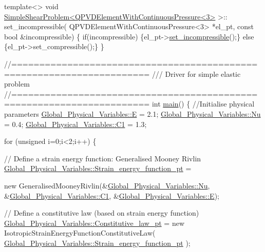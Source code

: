 \begin{DoxyCodeInclude}
{{\textcolor{keyword}{template}<>
\textcolor{keywordtype}{void} \hyperlink{classSimpleShearProblem}{SimpleShearProblem<QPVDElementWithContinuousPressure<3>}
       >::
set\_incompressible(
 QPVDElementWithContinuousPressure<3> *el\_pt, \textcolor{keyword}{const} \textcolor{keywordtype}{bool} &incompressible)
\{
 \textcolor{keywordflow}{if}(incompressible) \{el\_pt->\hyperlink{classSimpleShearProblem_a3e5d5f57fc041531ee683f50395536f0}{set\_incompressible}();\}
 \textcolor{keywordflow}{else} \{el\_pt->set\_compressible();\}
\}


\textcolor{comment}{//======================================================================}\textcolor{comment}{}
\textcolor{comment}{/// Driver for simple elastic problem}
\textcolor{comment}{}\textcolor{comment}{//======================================================================}
\textcolor{keywordtype}{int} \hyperlink{refineable__simple__shear_8cc_ae66f6b31b5ad750f1fe042a706a4e3d4}{main}()
\{
 \textcolor{comment}{//Initialise physical parameters}
 \hyperlink{namespaceGlobal__Physical__Variables_a09a019474b7405b35da2437f7779bc7e}{Global\_Physical\_Variables::E}  = 2.1; 
 \hyperlink{namespaceGlobal__Physical__Variables_a3962c36313826b19f216f6bbbdd6a477}{Global\_Physical\_Variables::Nu} = 0.4; 
 \hyperlink{namespaceGlobal__Physical__Variables_a849754fa7155c1a31481674ce4845658}{Global\_Physical\_Variables::C1} = 1.3; 
 
  \textcolor{keywordflow}{for} (\textcolor{keywordtype}{unsigned} i=0;i<2;i++)
  \{

 \textcolor{comment}{// Define a strain energy function: Generalised Mooney Rivlin}
 \hyperlink{namespaceGlobal__Physical__Variables_af6838abf46c7850f1ee0b3452d6d2498}{Global\_Physical\_Variables::Strain\_energy\_function\_pt} =
       
  \textcolor{keyword}{new} GeneralisedMooneyRivlin(&\hyperlink{namespaceGlobal__Physical__Variables_a3962c36313826b19f216f6bbbdd6a477}{Global\_Physical\_Variables::Nu},
                              &\hyperlink{namespaceGlobal__Physical__Variables_a849754fa7155c1a31481674ce4845658}{Global\_Physical\_Variables::C1},
                              &\hyperlink{namespaceGlobal__Physical__Variables_a09a019474b7405b35da2437f7779bc7e}{Global\_Physical\_Variables::E});
 
 \textcolor{comment}{// Define a constitutive law (based on strain energy function)}
 \hyperlink{namespaceGlobal__Physical__Variables_a5d5f19442938130d36ee7476ae25049c}{Global\_Physical\_Variables::Constitutive\_law\_pt} = 
  \textcolor{keyword}{new} IsotropicStrainEnergyFunctionConstitutiveLaw(
   \hyperlink{namespaceGlobal__Physical__Variables_af6838abf46c7850f1ee0b3452d6d2498}{Global\_Physical\_Variables::Strain\_energy\_function\_pt}
      );

}}
\end{DoxyCodeInclude}
